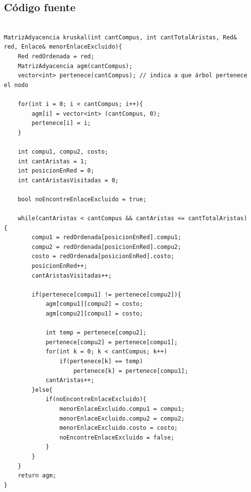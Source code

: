\newpage


\subsection{C\'odigo fuente}

\begin{lstlisting}

MatrizAdyacencia kruskal(int cantCompus, int cantTotalAristas, Red& red, Enlace& menorEnlaceExcluido){
    Red redOrdenada = red;
    MatrizAdyacencia agm(cantCompus);
    vector<int> pertenece(cantCompus); // indica a que árbol pertenece el nodo
 
    for(int i = 0; i < cantCompus; i++){
        agm[i] = vector<int> (cantCompus, 0);
        pertenece[i] = i;
    }
 
    int compu1, compu2, costo;
    int cantAristas = 1;
    int posicionEnRed = 0;
    int cantAristasVisitadas = 0;

    bool noEncontreEnlaceExcluido = true;

    while(cantAristas < cantCompus && cantAristas <= cantTotalAristas){
        compu1 = redOrdenada[posicionEnRed].compu1;
        compu2 = redOrdenada[posicionEnRed].compu2;
        costo = redOrdenada[posicionEnRed].costo;
        posicionEnRed++;
        cantAristasVisitadas++;

        if(pertenece[compu1] != pertenece[compu2]){
            agm[compu1][compu2] = costo;
            agm[compu2][compu1] = costo;
 
        	int temp = pertenece[compu2];
        	pertenece[compu2] = pertenece[compu1];
        	for(int k = 0; k < cantCompus; k++)
        		if(pertenece[k] == temp)
        			pertenece[k] = pertenece[compu1]; 
            cantAristas++;
        }else{
            if(noEncontreEnlaceExcluido){
                menorEnlaceExcluido.compu1 = compu1;
                menorEnlaceExcluido.compu2 = compu2;
                menorEnlaceExcluido.costo = costo;
                noEncontreEnlaceExcluido = false;
            }
        }
    }
    return agm;
}





\end{lstlisting}



